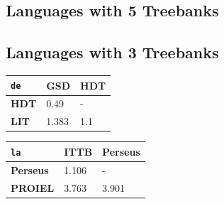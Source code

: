 \begin{minipage}{0.48\textwidth}
    \vspace{1cm}
    \subsection*{Languages with 5 Treebanks}
    \end{minipage}
    \hfill
    \begin{minipage}{0.48\textwidth}
    \subsection*{Languages with 3 Treebanks}
    \begin{table}[H]
    \begin{tabular}{|l|l|l|}
    \hline
    \texttt{de} & \textbf{GSD} & \textbf{HDT} \\
    \hline
    \textbf{HDT} & 0.49 & - \\
    \hline
    \textbf{LIT} & 1.383 & 1.1 \\
    \hline
    \end{tabular}
    \end{table}
    
    \begin{table}[H]
    \begin{tabular}{|l|l|l|}
    \hline
    \texttt{la} & \textbf{ITTB} & \textbf{Perseus} \\
    \hline
    \textbf{Perseus} & 1.106 & - \\
    \hline
    \textbf{PROIEL} & 3.763 & 3.901 \\
    \hline
    \end{tabular}
    \end{table}
    
    \begin{table}[H]
    \end{table}
    
    \begin{table}[H]
    \end{table}
    

\end{minipage}
